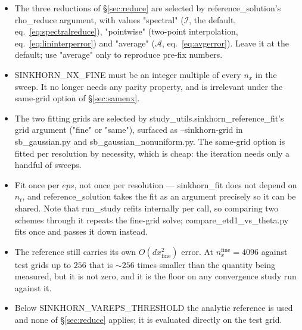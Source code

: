 \documentclass[11pt]{article}
\newcommand{\eps}{\varepsilon}
\newcommand{\dt}{\Delta t}
\newcommand{\dx}{\Delta x}
\newcommand{\code}[1]{\texttt{#1}}
\def\eps{eps}\def\dt{dt}\def\dx{dx}\def\code#1{#1}%
\begin{document}
\begin{itemize}
  \item The three reductions of \S\ref{sec:reduce} are selected by
        \code{reference\_solution}'s \code{rho\_reduce} argument, with values
        \code{"spectral"} ($\mathcal{I}$, the default, eq.~\eqref{eq:spectralreduce}),
        \code{"pointwise"} (two-point interpolation, eq.~\eqref{eq:lininterperror})
        and \code{"average"} ($\mathcal{A}$, eq.~\eqref{eq:avgerror}). Leave it at
        the default; use \code{"average"} only to reproduce pre-fix numbers.
  \item \code{SINKHORN\_NX\_FINE} must be an integer multiple of every $n_x$ in
        the sweep. It no longer needs any parity property, and is irrelevant
        under the same-grid option of \S\ref{sec:samenx}.
  \item The two fitting grids are selected by
        \code{study\_utils.sinkhorn\_reference\_fit}'s \code{grid} argument
        (\code{"fine"} or \code{"same"}), surfaced as \code{--sinkhorn-grid} in
        \code{sb\_gaussian.py} and \code{sb\_gaussian\_nonuniform.py}. The
        same-grid option is fitted per resolution by necessity, which is cheap:
        the iteration needs only a handful of sweeps.
  \item Fit once per $\eps$, not once per resolution --- \code{sinkhorn\_fit}
        does not depend on $n_t$, and \code{reference\_solution} takes the fit
        as an argument precisely so it can be shared. Note that
        \code{run\_study} refits internally per call, so comparing two schemes
        through it repeats the fine-grid solve; \code{compare\_etd1\_vs\_theta.py}
        fits once and passes it down instead.
  \item The reference still carries its own $O(\dx_{\text{fine}}^2)$ error. At
        $n_x^{\text{fine}}=4096$ against test grids up to $256$ that is
        $\sim\!256$ times smaller than the quantity being measured, but it is
        not zero, and it is the floor on any convergence study run against it.
  \item Below \code{SINKHORN\_VAREPS\_THRESHOLD} the analytic reference is used
        and none of \S\ref{sec:reduce} applies; it is evaluated directly on the
        test grid.
\end{itemize}
\end{document}
